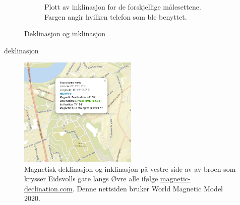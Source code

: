 \begin{figure}[h!]
\begin{subfigure}{.5\textwidth}
    \caption{Plott av inklinasjon for de forskjellige målesettene. \\
    Fargen angir hvilken telefon som ble benyttet.}
    \label{fig:plot_inklination}
\end{subfigure}
    \caption{Deklinasjon og inklinasjon}
    \label{Ink_og_dek}
\end{figure}



{deklinasjon}

\begin{figure}[h!]
    \centering
    \includegraphics[width=0.5\textwidth]{img/WMM.png}
    \caption{Magnetisk deklinasjon og inklinasjon på vestre side av av broen som krysser Eidsvolls gate langs Øvre alle ifølge \href{https://www.magnetic-declination.com/}{magnetic-declination.com}. Denne nettsiden bruker World Magnetic Model 2020. \cite{magnetic_declination}}
    \label{fig:WMM}
\end{figure}

